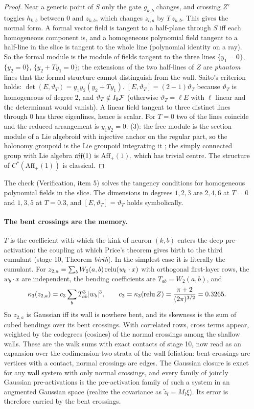 \begin{proof}
Near a generic point of $S$ only the gate $g_{k,b}$ changes, and crossing $Z'$ toggles $h_{k,b}$ between $0$ and $z_{k,b}$, which changes
$z_{l,a}$ by $T\,z_{k,b}$. This gives the normal form. A formal vector field is tangent to a half-plane through $S$ iff each homogeneous
component is, and a homogeneous polynomial field tangent to a half-line in the slice is tangent to the whole line (polynomial identity on
a ray). So the formal module is the module of fields tangent to the three lines $\{y_1=0\}$, $\{y_2=0\}$, $\{y_2+Ty_1=0\}$; the extensions of the
two half-lines of $Z$ are \emph{phantom} lines that the formal structure cannot distinguish from the wall. Saito's criterion holds:
$\det(E,\vartheta_T)=y_1y_2(y_2+Ty_1)$. $[E,\vartheta_T]=(2-1)\vartheta_T$ because $\vartheta_T$ is homogeneous of degree $2$, and $\vartheta_T\notin I_0\mathcal F$ (otherwise
$\vartheta_T=\ell E$ with $\ell$ linear and the determinant would vanish). A linear field tangent to three distinct lines through $0$ has three
eigenlines, hence is scalar. For $T=0$ two of the lines coincide and the reduced arrangement is $y_1y_2=0$. (3): the free module is the
section module of a Lie algebroid with injective anchor on the regular part, so the holonomy groupoid is the Lie groupoid integrating it
\cite{AS,Louis}; the simply connected group with Lie algebra $\mathfrak{aff}(1)$ is $\mathrm{Aff}_+(1)$, which has trivial centre. The structure of
$C^*(\mathrm{Aff}_+(1))$ is classical.
\end{proof}
The check (Verification, item 5) solves the tangency conditions for homogeneous polynomial fields in the slice. The dimensions in degrees
$1,2,3$ are $2,4,6$ at $T=0$ and $1,3,5$ at $T=0.3$, and $[E,\vartheta_T]=\vartheta_T$ holds symbolically.

\paragraph{The bent crossings are the memory.} $T$ is the coefficient with which the kink of neuron $(k,b)$ enters the deep pre-activation:
the coupling at which Price's theorem gives birth to the third cumulant (stage 10, Theorem \emph{birth}). In the simplest case it is literally
the cumulant. For $z_{2,a}=\sum_bW_2(a,b)\operatorname{relu}(w_b\cdot x)$ with orthogonal first-layer rows, the $w_b\cdot x$ are independent, the bending
coefficients are $T_{ab}=W_2(a,b)$, and
\[
\kappa_3(z_{2,a})=c_3\sum_bT_{ab}^3|w_b|^3,\qquad c_3=\kappa_3(\operatorname{relu} Z)=\frac{\pi+2}{(2\pi)^{3/2}}=0.3265 .
\]
So $z_{2,a}$ is Gaussian iff its wall is nowhere bent, and its skewness is the sum of cubed bendings over its bent crossings. With
correlated rows, cross terms appear, weighted by the codegrees (cosines) of the normal crossings among the shallow walls. These are
the walk sums with exact contacts of stage 10, now read as an expansion over the codimension-two strata of the wall foliation: bent
crossings are vertices with a contact, normal crossings are edges. The Gaussian closure is exact for any wall system with only normal
crossings, and every family of jointly Gaussian pre-activations is the pre-activation family of such a system in an augmented Gaussian
space (realize the covariance as $\tilde z_l=M_l\xi$). Its error is therefore carried by the bent crossings.


